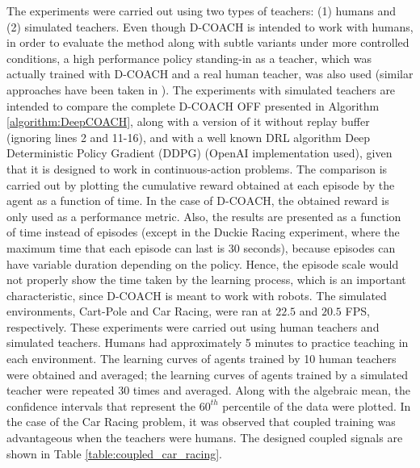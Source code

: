 The experiments were carried out using two types of teachers: (1) humans and (2) simulated teachers. Even though D-COACH is intended to work with humans, in order to evaluate the method along with subtle variants under more controlled conditions, a high performance policy standing-in as a teacher, which was actually trained with D-COACH and a real human teacher, was also used (similar approaches have been taken in \cite{Celemin2018AnInteractive, griffith2013policy}). The experiments with simulated teachers are intended to compare the complete $\text{D-COACH}$ OFF presented in Algorithm \ref{algorithm:DeepCOACH}, along with a version of it without replay buffer (ignoring lines 2 and 11-16), and with a well known DRL algorithm Deep Deterministic Policy Gradient (DDPG) \cite{Lillicrap2015} (OpenAI \cite{baselines} implementation used), given that it is designed to work in continuous-action problems. The comparison is carried out by plotting the cumulative reward obtained at each episode by the agent as a function of time. In the case of $\text{D-COACH}$, the obtained reward is only used as a performance metric. Also, the results are presented as a function of time instead of episodes (except in the Duckie Racing experiment, where the maximum time that each episode can last is 30 seconds), because episodes can have variable duration depending on the policy. Hence, the episode scale would not properly show the time taken by the learning process, which is an important characteristic, since $\text{D-COACH}$ is meant to work with robots. The simulated environments, Cart-Pole and Car Racing, were ran at $22.5$ and $20.5$ FPS, respectively. These experiments were carried out using human teachers and simulated teachers. Humans had approximately 5 minutes to practice teaching in each environment. The learning curves of agents trained by 10 human teachers were obtained and averaged; the learning curves of agents trained by a simulated teacher were repeated 30 times and averaged. Along with the algebraic mean, the confidence intervals that represent the $60^{th}$ percentile of the data were plotted. In the case of the Car Racing problem, it was observed that coupled training was advantageous when the teachers were humans. The designed coupled signals are shown in Table \ref{table:coupled_car_racing}.

